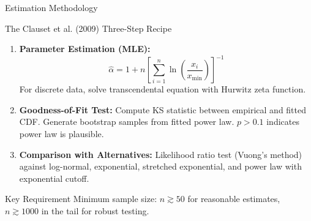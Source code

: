 \documentclass[10pt,aspectratio=169]{beamer}
\begin{document}
\begin{frame}{Estimation Methodology}
\begin{block}{The Clauset et al. (2009) Three-Step Recipe}
\begin{enumerate}
    \item \textbf{Parameter Estimation (MLE):}
    $$\hat{\alpha} = 1 + n \left[\sum_{i=1}^{n} \ln\left(\frac{x_i}{x_{\min}}\right)\right]^{-1}$$
    For discrete data, solve transcendental equation with Hurwitz zeta function.

    \vspace{0.2cm}

    \item \textbf{Goodness-of-Fit Test:}
    Compute KS statistic between empirical and fitted CDF. Generate bootstrap samples from fitted power law. $p > 0.1$ indicates power law is plausible.

    \vspace{0.2cm}

    \item \textbf{Comparison with Alternatives:}
    Likelihood ratio test (Vuong's method) against log-normal, exponential, stretched exponential, and power law with exponential cutoff.
\end{enumerate}
\end{block}

\begin{alertblock}{Key Requirement}
Minimum sample size: $n \gtrsim 50$ for reasonable estimates, $n \gtrsim 1000$ in the tail for robust testing.
\end{alertblock}
\end{frame}
\end{document}
